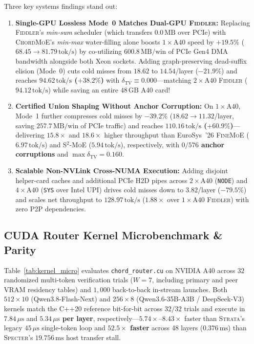 \documentclass[10pt,twocolumn]{article}
\theoremstyle{definition}
\begin{document}
Three key systems findings stand out:
\begin{enumerate}
  \item \textbf{Single-GPU Lossless Mode~0 Matches Dual-GPU \textsc{Fiddler}:} Replacing \textsc{Fiddler}'s \emph{min-sum} scheduler (which transfers $0.0\,\text{MB}$ over PCIe) with \textsc{ChordMoE}'s \emph{min-max} water-filling alone boosts $1\times\text{A40}$ speed by $+19.5\%$ ($68.45 \to 81.79\,\text{tok/s}$) by co-utilizing $600.8\,\text{MB/win}$ of PCIe Gen4 DMA bandwidth alongside both Xeon sockets. Adding graph-preserving dead-suffix elision (Mode~0) cuts cold misses from $18.62$ to $14.54$/layer ($-21.9\%$) and reaches \textbf{$94.62\,\text{tok/s}$ ($+38.2\%$)} with $\delta_{\mathrm{TV}} \equiv 0.000$—matching $2\times\text{A40}$ \textsc{Fiddler} ($94.12\,\text{tok/s}$) while saving an entire $48\,\text{GB}$ A40 card!
  \item \textbf{Certified Union Shaping Without Anchor Corruption:} On $1\times\text{A40}$, Mode~1 further compresses cold misses by \textbf{$-39.2\%$} ($18.62 \to 11.32$/layer, saving $257.7\,\text{MB/win}$ of PCIe traffic) and reaches \textbf{$110.16\,\text{tok/s}$ ($+60.9\%$)}—delivering \textbf{$15.8\times$} and \textbf{$18.6\times$} higher throughput than EuroSys~'26 \textsc{FineMoE} ($6.97\,\text{tok/s}$) and \textsc{S$^2$-MoE} ($5.94\,\text{tok/s}$), respectively, with \textbf{$0/576$ anchor corruptions} and $\max \delta_{\mathrm{TV}} = 0.160$.
  \item \textbf{Scalable Non-NVLink Cross-NUMA Execution:} Adding disjoint helper-card caches and additional PCIe H2D pipes across $2\times\text{A40}$ (\texttt{NODE}) and $4\times\text{A40}$ (\texttt{SYS} over Intel UPI) drives cold misses down to $3.82$/layer ($-79.5\%$) and scales net throughput to \textbf{$128.97\,\text{tok/s}$} ($1.88\times$ over $1\times\text{A40}$ \textsc{Fiddler}) with zero P2P dependencies.
\end{enumerate}

\subsection{CUDA Router Kernel Microbenchmark \& Parity}
\label{sec:eval_kernel}

Table~\ref{tab:kernel_micro} evaluates \texttt{chord\_router.cu} on NVIDIA A40 across $32$ randomized multi-token verification trials ($W=7$, including primary and peer VRAM residency tables) and $1,000$ back-to-back in-stream launches. Both $512 \times 10$ (Qwen3.8-Flash-Next) and $256 \times 8$ (Qwen3.6-35B-A3B / DeepSeek-V3) kernels match the C++20 reference bit-for-bit across $32/32$ trials and execute in \textbf{$7.84\,\mu\text{s}$} and \textbf{$5.34\,\mu\text{s}$ per layer}, respectively—$5.74\times\text{--}8.43\times$ faster than \textsc{Strata}'s legacy $45\,\mu\text{s}$ single-token loop and \textbf{$52.5\times$ faster} across 48 layers ($0.376\,\text{ms}$) than \textsc{Specter}'s $19.756\,\text{ms}$ host transfer stall.
\end{document}
